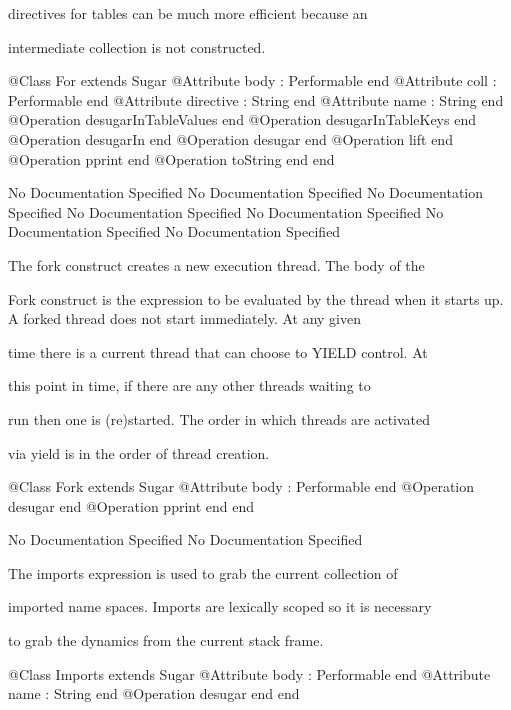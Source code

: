       directives for tables can be much more efficient because an

      intermediate collection is not constructed.
\begin{Interface}
@Class For extends Sugar
  @Attribute body : Performable end
  @Attribute coll : Performable end
  @Attribute directive : String end
  @Attribute name : String end
  @Operation desugarInTableValues end
  @Operation desugarInTableKeys end
  @Operation desugarIn end
  @Operation desugar end
  @Operation lift end
  @Operation pprint end
  @Operation toString end
end
\end{Interface}
No Documentation Specified
No Documentation Specified
No Documentation Specified
No Documentation Specified
No Documentation Specified
No Documentation Specified
No Documentation Specified

      The fork construct creates a new execution thread. The body of the

      Fork construct is the expression to be evaluated by the thread when 
      it starts up. A forked thread does not start immediately. At any given

      time there is a current thread that can choose to YIELD control. At

      this point in time, if there are any other threads waiting to

      run then one is (re)started. The order in which threads are activated

      via yield is in the order of thread creation.
\begin{Interface}
@Class Fork extends Sugar
  @Attribute body : Performable end
  @Operation desugar end
  @Operation pprint end
end
\end{Interface}
No Documentation Specified
No Documentation Specified

      The imports expression is used to grab the current collection of

      imported name spaces. Imports are lexically scoped so it is necessary

      to grab the dynamics from the current stack frame.
\begin{Interface}
@Class Imports extends Sugar
  @Attribute body : Performable end
  @Attribute name : String end
  @Operation desugar end
end
\end{Interface}

